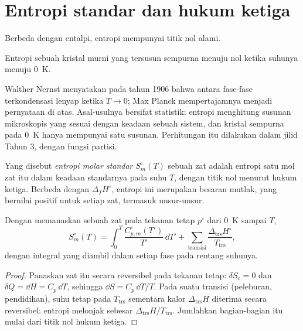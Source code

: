 \section{Entropi standar dan hukum ketiga}

Berbeda dengan entalpi, entropi mempunyai titik nol alami.

\begin{theorem}\label{thm:b2:reaction-free-energy:third-law}
Entropi sebuah kristal murni yang tersusun sempurna menuju nol ketika
suhunya menuju \qty{0}{K}.
\end{theorem}
\admitted

\begin{remark}\label{rem:b2:reaction-free-energy:third-law}
Walther Nernst menyatakan pada tahun 1906 bahwa  antara
fase-fase terkondensasi lenyap ketika $T \to 0$; Max Planck mempertajamnya
menjadi pernyataan di atas. Asal-usulnya bersifat statistik: entropi
menghitung susunan mikroskopis yang sesuai dengan keadaan sebuah sistem,
dan kristal sempurna pada \qty{0}{K} hanya mempunyai satu susunan.
Perhitungan itu dilakukan dalam jilid Tahun 3, dengan fungsi partisi.
\end{remark}

\begin{definition}\label{def:b2:reaction-free-energy:standard-entropy}
Yang disebut \emph{entropi molar standar}
$S^\circ_m(T)$ sebuah zat adalah entropi satu mol zat itu dalam keadaan
standarnya pada suhu $T$, dengan titik nol menurut hukum ketiga. Berbeda
dengan $\Delta_f H^\circ$, entropi ini merupakan besaran mutlak, yang
bernilai positif untuk setiap zat, termasuk unsur-unsur.
\end{definition}

\begin{proposition}\label{prop:b2:reaction-free-energy:absolute-entropy}
Dengan memanaskan sebuah zat pada tekanan tetap $p^\circ$ dari \qty{0}{K} sampai $T$,
\[
  S^\circ_m(T) = \int_0^T\frac{C^\circ_{p,m}(T')}{T'}\,\dd T' +
  \sum_{\text{transisi}}\frac{\Delta_{\text{trs}}H^\circ}{T_{\text{trs}}} ,
\]
dengan integral yang diambil dalam setiap fase pada rentang suhunya.
\end{proposition}

\begin{proof}
Panaskan zat itu secara reversibel pada tekanan tetap: $\delta S_{\text{c}} =
0$ dan $\delta Q = \dd H = C_p\,\dd T$, sehingga $\dd S = C_p\,\dd T/T$. Pada
suatu transisi (peleburan, pendidihan), suhu tetap pada $T_{\text{trs}}$
sementara kalor $\Delta_{\text{trs}}H$ diterima secara reversibel: entropi
melonjak sebesar $\Delta_{\text{trs}}H/T_{\text{trs}}$. Jumlahkan
bagian-bagian itu mulai dari titik nol hukum ketiga.
\end{proof}

